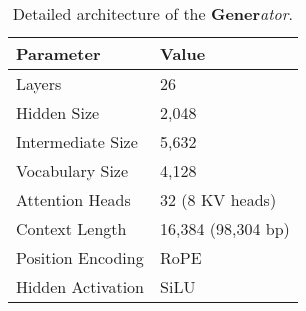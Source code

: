 \begin{table}[!htb]
    \small
    \centering
    \caption{Detailed architecture of the \textbf{Gener}\textit{ator}.}
    \begin{tabular}{ll}
        \toprule
        \textbf{Parameter} & \textbf{Value} \\
        \midrule
        Layers & 26 \\
        Hidden Size & 2,048 \\
        Intermediate Size & 5,632 \\
        Vocabulary Size & 4,128 \\
        Attention Heads & 32 (8 KV heads) \\
        Context Length & 16,384 (98,304 bp)\\
        Position Encoding & RoPE~\cite{rope} \\
        Hidden Activation & SiLU~\cite{silu} \\
        \bottomrule
    \end{tabular}
    \label{tab:model_arch}
\end{table}